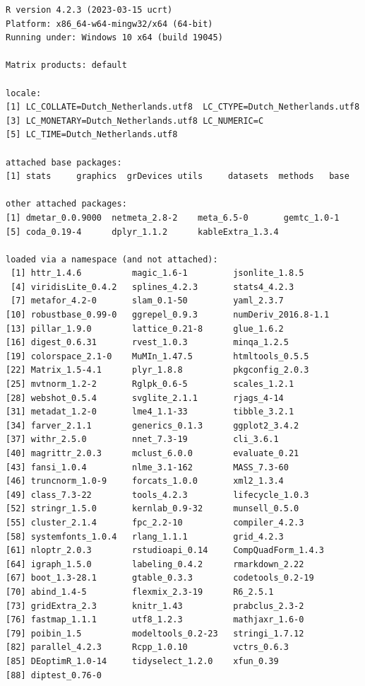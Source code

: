 \documentclass[
  letterpaper,
  DIV=11,
  numbers=noendperiod]{scrreprt}
\begin{document}
\begin{verbatim}
R version 4.2.3 (2023-03-15 ucrt)
Platform: x86_64-w64-mingw32/x64 (64-bit)
Running under: Windows 10 x64 (build 19045)

Matrix products: default

locale:
[1] LC_COLLATE=Dutch_Netherlands.utf8  LC_CTYPE=Dutch_Netherlands.utf8   
[3] LC_MONETARY=Dutch_Netherlands.utf8 LC_NUMERIC=C                      
[5] LC_TIME=Dutch_Netherlands.utf8    

attached base packages:
[1] stats     graphics  grDevices utils     datasets  methods   base     

other attached packages:
[1] dmetar_0.0.9000  netmeta_2.8-2    meta_6.5-0       gemtc_1.0-1     
[5] coda_0.19-4      dplyr_1.1.2      kableExtra_1.3.4

loaded via a namespace (and not attached):
 [1] httr_1.4.6          magic_1.6-1         jsonlite_1.8.5     
 [4] viridisLite_0.4.2   splines_4.2.3       stats4_4.2.3       
 [7] metafor_4.2-0       slam_0.1-50         yaml_2.3.7         
[10] robustbase_0.99-0   ggrepel_0.9.3       numDeriv_2016.8-1.1
[13] pillar_1.9.0        lattice_0.21-8      glue_1.6.2         
[16] digest_0.6.31       rvest_1.0.3         minqa_1.2.5        
[19] colorspace_2.1-0    MuMIn_1.47.5        htmltools_0.5.5    
[22] Matrix_1.5-4.1      plyr_1.8.8          pkgconfig_2.0.3    
[25] mvtnorm_1.2-2       Rglpk_0.6-5         scales_1.2.1       
[28] webshot_0.5.4       svglite_2.1.1       rjags_4-14         
[31] metadat_1.2-0       lme4_1.1-33         tibble_3.2.1       
[34] farver_2.1.1        generics_0.1.3      ggplot2_3.4.2      
[37] withr_2.5.0         nnet_7.3-19         cli_3.6.1          
[40] magrittr_2.0.3      mclust_6.0.0        evaluate_0.21      
[43] fansi_1.0.4         nlme_3.1-162        MASS_7.3-60        
[46] truncnorm_1.0-9     forcats_1.0.0       xml2_1.3.4         
[49] class_7.3-22        tools_4.2.3         lifecycle_1.0.3    
[52] stringr_1.5.0       kernlab_0.9-32      munsell_0.5.0      
[55] cluster_2.1.4       fpc_2.2-10          compiler_4.2.3     
[58] systemfonts_1.0.4   rlang_1.1.1         grid_4.2.3         
[61] nloptr_2.0.3        rstudioapi_0.14     CompQuadForm_1.4.3 
[64] igraph_1.5.0        labeling_0.4.2      rmarkdown_2.22     
[67] boot_1.3-28.1       gtable_0.3.3        codetools_0.2-19   
[70] abind_1.4-5         flexmix_2.3-19      R6_2.5.1           
[73] gridExtra_2.3       knitr_1.43          prabclus_2.3-2     
[76] fastmap_1.1.1       utf8_1.2.3          mathjaxr_1.6-0     
[79] poibin_1.5          modeltools_0.2-23   stringi_1.7.12     
[82] parallel_4.2.3      Rcpp_1.0.10         vctrs_0.6.3        
[85] DEoptimR_1.0-14     tidyselect_1.2.0    xfun_0.39          
[88] diptest_0.76-0     
\end{verbatim}
\end{document}
